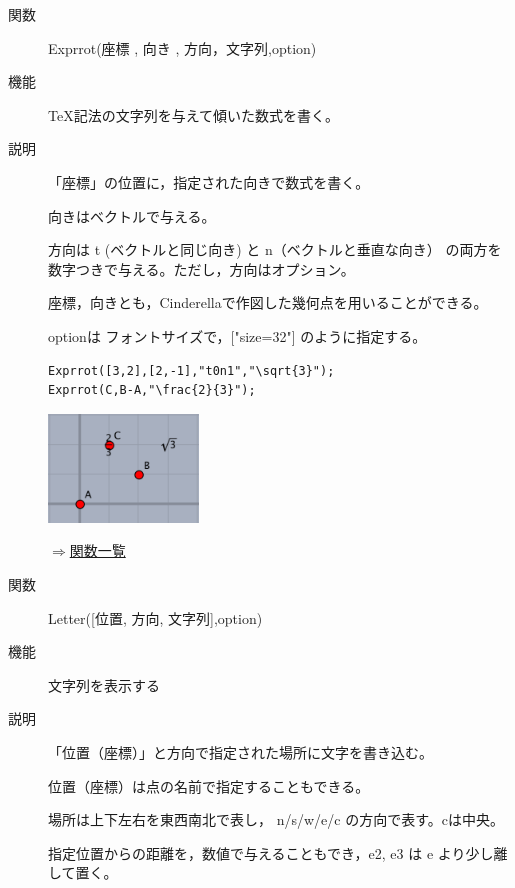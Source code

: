 \documentclass[papersize,a4paper,12pt,uplatex]{jsarticle}
\begin{document}
\begin{description}
\vspace{\baselineskip}
\hypertarget{exprrot}{}
\item[関数]Exprrot(座標 , 向き , 方向，文字列,option)
\item[機能]\TeX 記法の文字列を与えて傾いた数式を書く。
\item[説明]「座標」の位置に，指定された向きで数式を書く。

向きはベクトルで与える。

方向は t (ベクトルと同じ向き) と n（ベクトルと垂直な向き） の両方を数字つきで与える。ただし，方向はオプション。

座標，向きとも，Cinderellaで作図した幾何点を用いることができる。

optionは フォントサイズで，["size=32"] のように指定する。

\begin{verbatim}
Exprrot([3,2],[2,-1],"t0n1","\sqrt{3}");
Exprrot(C,B-A,"\frac{2}{3}");
\end{verbatim}

\vspace{\baselineskip}
\hspace{10mm}\includegraphics[bb=0.00 0.00 181.01 131.01,width=4cm]{Fig/exprrot.pdf} \hspace{10mm} 

\begin{flushright}\hyperlink{functionlist}{$\Rightarrow$関数一覧}\end{flushright}

\vspace{\baselineskip}
\hypertarget{letter}{}\item[関数]Letter([位置, 方向, 文字列],option)
\item[機能]文字列を表示する
\item[説明]「位置（座標）」と方向で指定された場所に文字を書き込む。

位置（座標）は点の名前で指定することもできる。

場所は上下左右を東西南北で表し， n/s/w/e/c の方向で表す。cは中央。

指定位置からの距離を，数値で与えることもでき，e2, e3 は e より少し離して置く。


\end{description}
\end{document}
